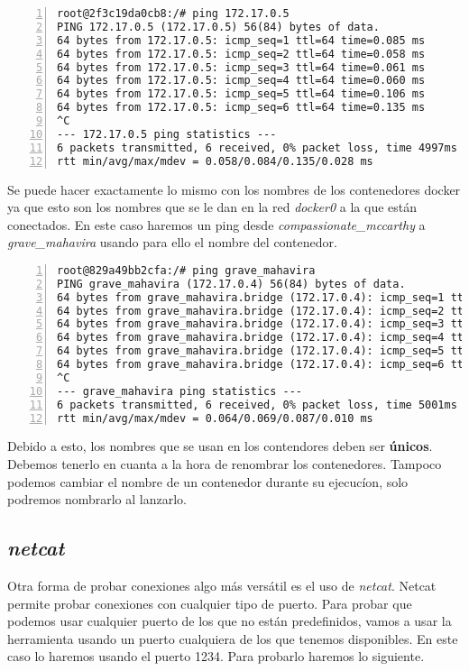 		\begin{lstlisting}[style=consola,numbers=left]
root@2f3c19da0cb8:/# ping 172.17.0.5
PING 172.17.0.5 (172.17.0.5) 56(84) bytes of data.
64 bytes from 172.17.0.5: icmp_seq=1 ttl=64 time=0.085 ms
64 bytes from 172.17.0.5: icmp_seq=2 ttl=64 time=0.058 ms
64 bytes from 172.17.0.5: icmp_seq=3 ttl=64 time=0.061 ms
64 bytes from 172.17.0.5: icmp_seq=4 ttl=64 time=0.060 ms
64 bytes from 172.17.0.5: icmp_seq=5 ttl=64 time=0.106 ms
64 bytes from 172.17.0.5: icmp_seq=6 ttl=64 time=0.135 ms
^C
--- 172.17.0.5 ping statistics ---
6 packets transmitted, 6 received, 0% packet loss, time 4997ms
rtt min/avg/max/mdev = 0.058/0.084/0.135/0.028 ms
		\end{lstlisting}
		
		Se puede hacer exactamente lo mismo con los nombres de los contenedores docker ya que esto son los nombres que se le dan en la red \emph{docker0} a la que están conectados. En este caso haremos un ping desde \textit{compassionate\_mccarthy} a \textit{grave\_mahavira} usando para ello el nombre del contenedor.
		
		\begin{lstlisting}[style=consola,numbers=left]
root@829a49bb2cfa:/# ping grave_mahavira
PING grave_mahavira (172.17.0.4) 56(84) bytes of data.
64 bytes from grave_mahavira.bridge (172.17.0.4): icmp_seq=1 ttl=64 time=0.087 ms
64 bytes from grave_mahavira.bridge (172.17.0.4): icmp_seq=2 ttl=64 time=0.066 ms
64 bytes from grave_mahavira.bridge (172.17.0.4): icmp_seq=3 ttl=64 time=0.066 ms
64 bytes from grave_mahavira.bridge (172.17.0.4): icmp_seq=4 ttl=64 time=0.067 ms
64 bytes from grave_mahavira.bridge (172.17.0.4): icmp_seq=5 ttl=64 time=0.066 ms
64 bytes from grave_mahavira.bridge (172.17.0.4): icmp_seq=6 ttl=64 time=0.064 ms
^C
--- grave_mahavira ping statistics ---
6 packets transmitted, 6 received, 0% packet loss, time 5001ms
rtt min/avg/max/mdev = 0.064/0.069/0.087/0.010 ms
		\end{lstlisting}
		
		Debido a esto, los nombres que se usan en los contendores deben ser \textbf{únicos}. Debemos tenerlo en cuanta a la hora de renombrar los contenedores. Tampoco podemos cambiar el nombre de un  contenedor durante su ejecucíon, solo podremos nombrarlo al lanzarlo.
		
		\subsection{\textit{netcat}}
		Otra forma de probar conexiones algo más versátil es el uso de \emph{netcat}. Netcat permite probar conexiones con cualquier tipo de puerto. Para probar que podemos usar cualquier puerto de los que no están predefinidos, vamos a usar la herramienta usando un puerto cualquiera de los que tenemos disponibles. En este caso lo haremos usando el puerto 1234. Para probarlo haremos lo siguiente.
		
